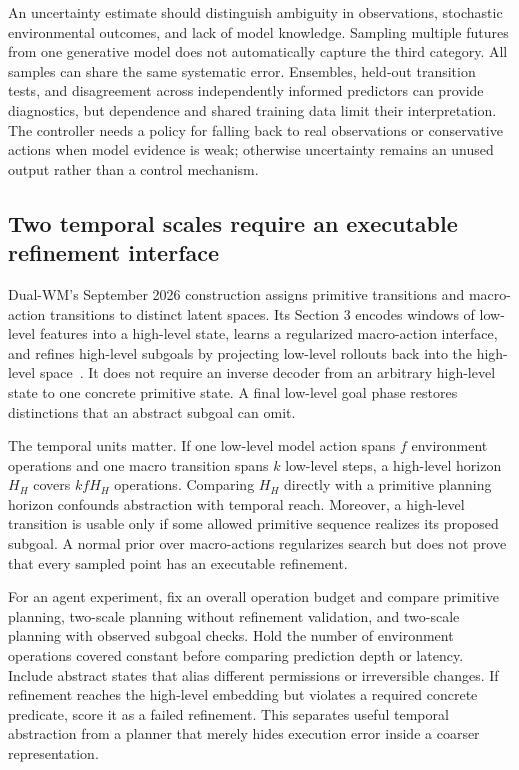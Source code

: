 An uncertainty estimate should distinguish ambiguity in observations, stochastic environmental outcomes, and lack of model knowledge. Sampling multiple futures from one generative model does not automatically capture the third category. All samples can share the same systematic error. Ensembles, held-out transition tests, and disagreement across independently informed predictors can provide diagnostics, but dependence and shared training data limit their interpretation. The controller needs a policy for falling back to real observations or conservative actions when model evidence is weak; otherwise uncertainty remains an unused output rather than a control mechanism.

\subsection{Two temporal scales require an executable refinement interface}
\label{sec:C06:dualscale}
Dual-WM's September 2026 construction assigns primitive transitions and macro-action transitions to distinct latent spaces. Its Section 3 encodes windows of low-level features into a high-level state, learns a regularized macro-action interface, and refines high-level subgoals by projecting low-level rollouts back into the high-level space~\cite{rewrite_dualwm2026}. It does not require an inverse decoder from an arbitrary high-level state to one concrete primitive state. A final low-level goal phase restores distinctions that an abstract subgoal can omit.

The temporal units matter. If one low-level model action spans $f$ environment operations and one macro transition spans $k$ low-level steps, a high-level horizon $H_H$ covers $kfH_H$ operations. Comparing $H_H$ directly with a primitive planning horizon confounds abstraction with temporal reach. Moreover, a high-level transition is usable only if some allowed primitive sequence realizes its proposed subgoal. A normal prior over macro-actions regularizes search but does not prove that every sampled point has an executable refinement.

For an agent experiment, fix an overall operation budget and compare primitive planning, two-scale planning without refinement validation, and two-scale planning with observed subgoal checks. Hold the number of environment operations covered constant before comparing prediction depth or latency. Include abstract states that alias different permissions or irreversible changes. If refinement reaches the high-level embedding but violates a required concrete predicate, score it as a failed refinement. This separates useful temporal abstraction from a planner that merely hides execution error inside a coarser representation.

